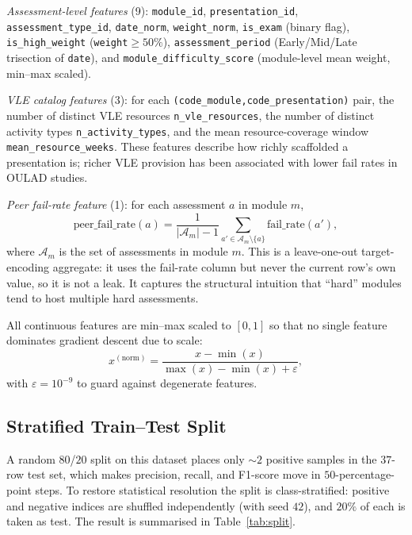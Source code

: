 \documentclass[conference]{IEEEtran}
\begin{document}
\emph{Assessment-level features} (9): \texttt{module\_id}, \texttt{presentation\_id}, \texttt{assessment\_type\_id}, \texttt{date\_norm}, \texttt{weight\_norm}, \texttt{is\_exam} (binary flag), \texttt{is\_high\_weight} (\texttt{weight}$\geq\!50\%$), \texttt{assessment\_period} (Early/Mid/Late trisection of \texttt{date}), and \texttt{module\_difficulty\_score} (module-level mean weight, min--max scaled).

\emph{VLE catalog features} (3): for each \texttt{(code\_module,code\_presentation)} pair, the number of distinct VLE resources \texttt{n\_vle\_resources}, the number of distinct activity types \texttt{n\_activity\_types}, and the mean resource-coverage window \texttt{mean\_resource\_weeks}. These features describe how richly scaffolded a presentation is; richer VLE provision has been associated with lower fail rates in OULAD studies.

\emph{Peer fail-rate feature} (1): for each assessment $a$ in module $m$,
\begin{equation}
\mathrm{peer\_fail\_rate}(a) = \frac{1}{|\mathcal{A}_m|-1} \sum_{a' \in \mathcal{A}_m \setminus \{a\}} \mathrm{fail\_rate}(a'),
\end{equation}
where $\mathcal{A}_m$ is the set of assessments in module $m$. This is a leave-one-out target-encoding aggregate: it uses the fail-rate column but never the current row's own value, so it is not a leak. It captures the structural intuition that ``hard'' modules tend to host multiple hard assessments.

All continuous features are min--max scaled to $[0,1]$ so that no single feature dominates gradient descent due to scale:
\begin{equation}
x^{(\mathrm{norm})} = \frac{x - \min(x)}{\max(x) - \min(x) + \varepsilon},
\end{equation}
with $\varepsilon = 10^{-9}$ to guard against degenerate features.

\subsection{Stratified Train--Test Split}
A random $80$/$20$ split on this dataset places only $\sim\!2$ positive samples in the $37$-row test set, which makes precision, recall, and F1-score move in $50$-percentage-point steps. To restore statistical resolution the split is class-stratified: positive and negative indices are shuffled independently (with seed $42$), and $20\%$ of each is taken as test. The result is summarised in Table~\ref{tab:split}.
\end{document}
